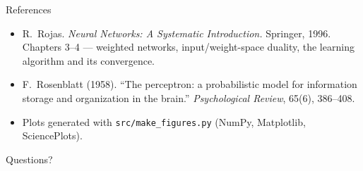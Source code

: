 \documentclass[aspectratio=169, 11pt]{beamer}
\newcommand{\nosrc}{}       %
\begin{document}
\begin{frame}{References}
  \nosrc
  \footnotesize
  \begin{itemize}\setlength{\itemsep}{3pt}
    \item R.~Rojas. \textit{Neural Networks: A Systematic
          Introduction.} Springer, 1996. Chapters 3--4 ---
          weighted networks, input/weight-space duality,
          the learning algorithm and its convergence.
    \item F.~Rosenblatt (1958). ``The perceptron: a
          probabilistic model for information storage and
          organization in the brain.'' \textit{Psychological
          Review}, 65(6), 386--408.
    \item Plots generated with \texttt{src/make\_figures.py}
          (NumPy, Matplotlib, SciencePlots).
  \end{itemize}
\end{frame}

\begin{frame}[standout]
  \nosrc
  Questions?
\end{frame}
\end{document}
